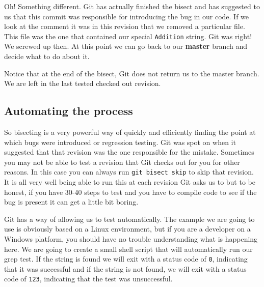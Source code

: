 Oh! Something different.  Git has actually finished the bisect and has suggested to us that this commit was responsible for introducing the bug in our code.
If we look at the comment it was in this revision that we removed a particular file.
This file was the one that contained our special \texttt{Addition} string.
Git was right! We screwed up then.  At this point we can go back to our \textbf{master} branch and decide what to do about it.


Notice that at the end of the bisect, Git does not return us to the master branch.
We are left in the last tested checked out revision.

\subsection{Automating the process}
So bisecting is a very powerful way of quickly and efficiently finding the point at which bugs were introduced or regression testing.
Git was spot on when it suggested that that revision was the one responsible for the mistake.
Sometimes you may not be able to test a revision that Git checks out for you for other reasons.
In this case you can always run \texttt{git bisect skip} to skip that revision.
It is all very well being able to run this at each revision Git asks us to but to be honest, if you have 30-40 steps to test and you have to compile code to see if the bug is present it can get a little bit boring.

Git has a way of allowing us to test automatically.
The example we are going to use is obviously based on a Linux environment, but if you are a developer on a Windows platform, you should have no trouble understanding what is happening here.
We are going to create a small shell script that will automatically run our grep test.
If the string is found we will exit with a status code of \texttt{0}, indicating that it was successful and if
the string is not found, we will exit with a status code of \texttt{123}, indicating that the test was unsuccessful.

